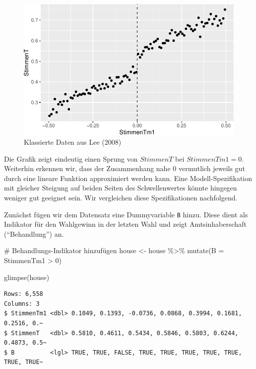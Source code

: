 \documentclass[
  a4paper,
  DIV=11,
  oneside]{scrreprt}
\newenvironment{Shaded}{\begin{snugshade}}{\end{snugshade}}
\newcommand{\AttributeTok}[1]{\textcolor[rgb]{0.40,0.45,0.13}{#1}}
\newcommand{\CommentTok}[1]{\textcolor[rgb]{0.37,0.37,0.37}{#1}}
\newcommand{\DecValTok}[1]{\textcolor[rgb]{0.68,0.00,0.00}{#1}}
\newcommand{\FunctionTok}[1]{\textcolor[rgb]{0.28,0.35,0.67}{#1}}
\newcommand{\NormalTok}[1]{\textcolor[rgb]{0.00,0.23,0.31}{#1}}
\newcommand{\OtherTok}[1]{\textcolor[rgb]{0.00,0.23,0.31}{#1}}
\newcommand{\SpecialCharTok}[1]{\textcolor[rgb]{0.37,0.37,0.37}{#1}}
\begin{document}
\begin{figure}[t]

{\centering \includegraphics{RDD_files/figure-pdf/fig-LeeDataClass-1.pdf}

}

\caption{\label{fig-LeeDataClass}Klassierte Daten aus Lee (2008)}

\end{figure}

Die Grafik zeigt eindeutig einen Sprung von \(StimmenT\) bei
\(StimmenTm1 = 0\). Weiterhin erkennen wir, dass der Zusammenhang nahe 0
vermutlich jeweils gut durch eine lineare Funktion approximiert werden
kann. Eine Modell-Spezifikation mit gleicher Steigung auf beiden Seiten
des Schwellenwertes könnte hingegen weniger gut geeignet sein. Wir
vergleichen diese Spezifikationen nachfolgend.

Zunächst fügen wir dem Datensatz eine Dummyvariable \texttt{B} hinzu.
Diese dient als Indikator für den Wahlgewinn in der letzten Wahl und
zeigt Amtsinhaberschaft (``Behandlung'') an.

\begin{Shaded}
\begin{Highlighting}[]
\CommentTok{\# Behandlungs{-}Indikator hinzufügen}
\NormalTok{house }\OtherTok{\textless{}{-}}\NormalTok{ house }\SpecialCharTok{\%\textgreater{}\%} 
  \FunctionTok{mutate}\NormalTok{(}\AttributeTok{B =}\NormalTok{ StimmenTm1 }\SpecialCharTok{\textgreater{}} \DecValTok{0}\NormalTok{)}

\FunctionTok{glimpse}\NormalTok{(house)}
\end{Highlighting}
\end{Shaded}

\begin{verbatim}
Rows: 6,558
Columns: 3
$ StimmenTm1 <dbl> 0.1049, 0.1393, -0.0736, 0.0868, 0.3994, 0.1681, 0.2516, 0.~
$ StimmenT   <dbl> 0.5810, 0.4611, 0.5434, 0.5846, 0.5803, 0.6244, 0.4873, 0.5~
$ B          <lgl> TRUE, TRUE, FALSE, TRUE, TRUE, TRUE, TRUE, TRUE, TRUE, TRUE~
\end{verbatim}
\end{document}
